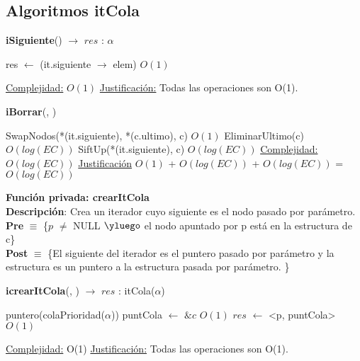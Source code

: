 \begin{Algoritmos}
\subsection{Algoritmos itCola}

\begin{algorithm}[H]
{\textbf{iSiguiente}() $\to$ $res$ : $\alpha$}
\begin{algorithmic}[1]
    \State res $\gets$ (it.siguiente $\rightarrow$ elem) \Comment $O(1)$

    \medskip
    \Statex \underline{Complejidad:} $O(1)$
    \Statex \underline{Justificaci\'on:} Todas las operaciones son O(1).
\end{algorithmic}
\end{algorithm}


\begin{algorithm}[H]
{\textbf{iBorrar}(, )}
\begin{algorithmic}[1]
    \State SwapNodos(*(it.siguiente), *(c.ultimo), c) \Comment $O(1)$
	\State EliminarUltimo(c) \Comment $O(log(EC))$
	\State SiftUp(*(it.siguiente), c) \Comment $O(log(EC))$
    \medskip
    \Statex \underline{Complejidad:} $O(log(EC))$
    \Statex \underline{Justificaci\'on} $O(1)$ + $O(log(EC))$ + $O(log(EC))$ = $O(log(EC))$
\end{algorithmic}
\end{algorithm}

\textbf{Funci\'on privada: crearItCola}\\
\textbf{Descripci\'on}: Crea un iterador cuyo siguiente es el nodo pasado por par\'ametro. \\
\textbf{Pre} $\equiv$ \{$p$ $\neq$ NULL $\yluego$ el nodo apuntado por p est\'a en la estructura de c\}\\%
\textbf{Post} $\equiv$ \{El siguiente del iterador es el puntero pasado por par\'ametro y la estructura es un puntero a la estructura pasada por par\'ametro. \}%
\begin{algorithm}[H]
{\textbf{icrearItCola}(, ) $\to$ $res$ : itCola($\alpha$)}
\begin{algorithmic}[1]

    \State puntero(colaPrioridad($\alpha$)) puntCola $\gets$ $\&c$ \Comment $O(1)$
    \State $res$ $\gets$ <p, puntCola> \Comment $O(1)$
   
    \medskip
    \Statex \underline{Complejidad:} O(1)
    \Statex \underline{Justificaci\'on:} Todas las operaciones son O(1).
\end{algorithmic}
\end{algorithm}

\end{Algoritmos}